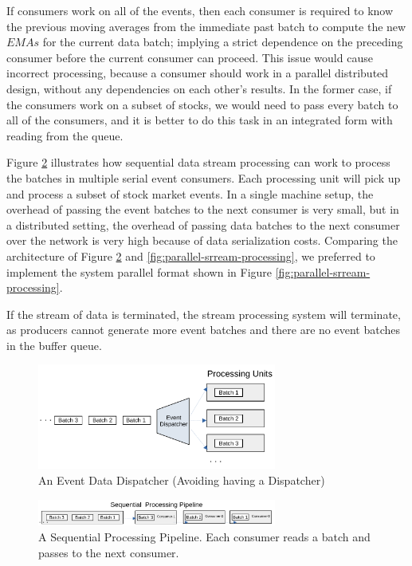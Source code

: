 If consumers work on all of the events, then each consumer is required to know the previous moving averages from the immediate past batch to compute the new $EMAs$ for
the current data batch; implying a strict dependence on the preceding consumer before the current consumer can proceed. This issue would cause incorrect processing, because a consumer should work in a parallel distributed design, without any dependencies on each other's results. In the former case, if the consumers work on a subset of stocks, we would need to pass every batch to all
of the consumers, and it is better to do this task in an integrated form with reading from the queue.


Figure \ref{fig:Sequential-batch-distributions} illustrates how sequential data stream processing can work to process the batches in multiple
serial event consumers. Each processing unit will pick up and process a subset of stock market events.
In a single machine setup, the overhead of passing the event batches to the next consumer is very small, but in a distributed setting, the
overhead of passing data batches to the next consumer over the network is very high because of data serialization costs. Comparing the
architecture of Figure \ref{fig:Sequential-batch-distributions} and \ref{fig:parallel-srream-processing}, we preferred to implement the system
parallel format shown in Figure \ref{fig:parallel-srream-processing}.


If the stream of data is terminated, the stream processing system will terminate, as producers cannot generate more event batches
 and there are no event batches in the buffer queue.


\begin{figure}[!h]
    \begin{center}
        \includegraphics[width=0.7\textwidth]{./images/Stream-Batch-Distributions}
        \caption{An Event Data Dispatcher (Avoiding having a Dispatcher)}
        \label{fig:batch-distributions}
    \end{center}
\end{figure}

\begin{figure}[!h]
    \begin{center}
        \includegraphics[width=0.7\textwidth]{./images/Stream-Batch-Distributions_op2}
        \caption{A Sequential Processing Pipeline. Each consumer reads a batch and passes to the next consumer.}
        \label{fig:Sequential-batch-distributions}
    \end{center}
\end{figure}


